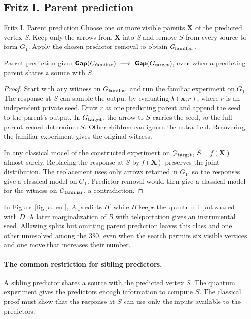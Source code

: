 \subsection{Fritz I. Parent prediction}\label{sec:parent}
\begin{piggyback}{Fritz I. Parent prediction}
Choose one or more visible parents \(\mathbf X\) of the predicted vertex
\(S\). Keep only the arrows from \(\mathbf X\) into \(S\) and remove \(S\)
from every source to form \(G_1\). Apply the chosen predictor removal to
obtain \(G_{\text{familiar}}\).
\end{piggyback}
\begin{proposition}\label{prop:parent}
Parent prediction gives \(\operatorname{\text{\normalfont\sffamily\bfseries Gap}}(G_{\text{familiar}})\implies\operatorname{\text{\normalfont\sffamily\bfseries Gap}}(G_{\text{target}})\), even
when a predicting parent shares a source with \(S\).
\end{proposition}
\begin{proof}
Start with any witness on \(G_{\text{familiar}}\) and run the familiar experiment
on \(G_1\). The response at \(S\) can sample the output by evaluating
\(h(\mathbf x,r)\), where \(r\) is an independent private seed. Draw \(r\)
at one predicting parent and append the seed to the parent's output.
In \(G_{\text{target}}\), the arrow to \(S\) carries the seed, so the full parent
record determines \(S\). Other children can ignore the extra field.
Recovering the familiar experiment gives the original witness.

In any classical model of the constructed experiment on \(G_{\text{target}}\),
\(S=f(\mathbf X)\) almost surely. Replacing the response at \(S\) by
\(f(\mathbf X)\) preserves the joint distribution. The replacement
uses only arrows retained in \(G_1\), so the responses give a classical
model on \(G_1\). Predictor removal would then give a classical model
for the witness on \(G_{\text{familiar}}\), a contradiction.
\end{proof}
In Figure~\ref{fig:parent}, \(A\) predicts \(B'\) while \(B\) keeps
the quantum input shared with \(D\). A later marginalization of \(B\)
with teleportation gives an instrumental seed. Allowing splits but
omitting parent prediction leaves this class and one other unresolved
among the 380, even when the search permits six visible vertices and
one move that increases their number.

\paragraph{The common restriction for sibling predictors.}
A sibling predictor shares a source with the predicted vertex \(S\).
The quantum experiment gives the predictors enough information to
compute \(S\). The classical proof must show that the response at \(S\)
can use only the inputs available to the predictors.

